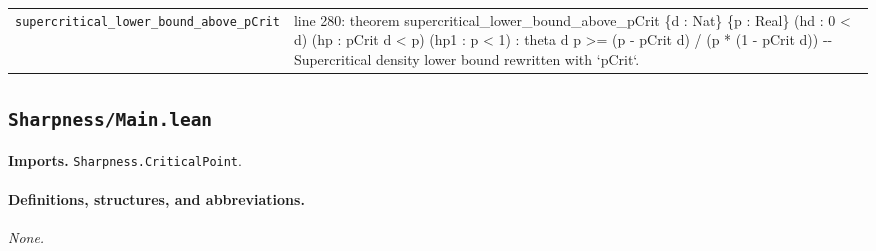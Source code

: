 \documentclass[10pt]{article}
\newcommand{\module}[1]{\texttt{#1}}
\begin{document}
\begin{longtable}{>{\raggedright\arraybackslash}p{} >{\raggedright\arraybackslash}p{}}
\texttt{supercritical\_\allowbreak{}lower\_\allowbreak{}bound\_\allowbreak{}above\_\allowbreak{}pCrit} & {\ttfamily\scriptsize line 280:\allowbreak{} theorem supercritical\_\allowbreak{}lower\_\allowbreak{}bound\_\allowbreak{}above\_\allowbreak{}pCrit \{d :\allowbreak{} Nat\} \{p :\allowbreak{} Real\} (\allowbreak{}hd :\allowbreak{} 0 < d)\allowbreak{} (\allowbreak{}hp :\allowbreak{} pCrit d < p)\allowbreak{} (\allowbreak{}hp1 :\allowbreak{} p < 1)\allowbreak{} :\allowbreak{} theta d p >=\allowbreak{} (\allowbreak{}p -\allowbreak{} pCrit d)\allowbreak{} /\allowbreak{} (\allowbreak{}p *\allowbreak{} (\allowbreak{}1 -\allowbreak{} pCrit d)\allowbreak{})\allowbreak{} -\allowbreak{}-\allowbreak{} Supercritical density lower bound rewritten with `pCrit`.\allowbreak{}} \\[0.45em]
\end{longtable}

\subsection*{\module{Sharpness/Main.lean}}
\textbf{Imports.} \module{Sharpness.CriticalPoint}.
\paragraph{Definitions, structures, and abbreviations.}
\emph{None.}
\end{document}

